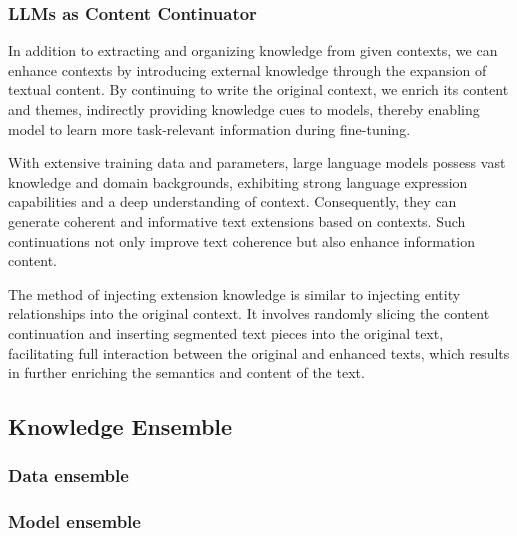 	
\subsubsection{LLMs as Content Continuator}
\label{sec:llm_as_continuator}

 In addition to extracting and organizing knowledge from given contexts, we can enhance contexts by introducing external knowledge through the expansion of textual content. By continuing to write the original context, we enrich its content and themes, indirectly providing knowledge cues to models, thereby enabling model to learn more task-relevant information during fine-tuning.
 
 With extensive training data and parameters, large language models possess vast knowledge and domain backgrounds, exhibiting strong language expression capabilities and a deep understanding of context. Consequently, they can generate coherent and informative text extensions based on contexts. Such continuations not only improve text coherence but also enhance information content.
 
 The method of injecting extension knowledge is similar to injecting entity relationships into the original context. It involves randomly slicing the content continuation and inserting segmented text pieces into the original text, facilitating full interaction between the original and enhanced texts, which results in further enriching the semantics and content of the text.


\subsection{Knowledge Ensemble}
\label{sec:knowledge_ensemble}

\subsubsection{Data ensemble}
\label{sec:data_ensemble}

\subsubsection{Model ensemble}
\label{sec:model_ensemble}




